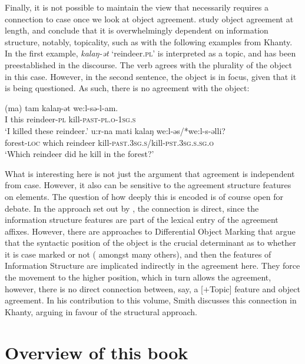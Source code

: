 \documentclass[output=paper
,modfonts
,nonflat]{langsci/langscibook}
\begin{document}
Finally, it is not possible to maintain the view that {\agr} necessarily requires a connection to case once we look at object agreement.
\citet{dn2011} study object agreement at length, and conclude that it is overwhelmingly dependent on information structure, notably, topicality, such as with the following examples from Khanty.
In the first example, \textit{kalaŋ-ət} `reindeer.\textsc{pl}' is interpreted as a topic, and has been preestablished in the discourse. The verb agrees with the plurality of the object in this case.
However, in the second sentence, the object is in focus, given that it is being questioned.
As such, there is no agreement with the object:
\begin{exe}
	\ex
	\begin{xlist}
		\ex
		\gll (ma) tam kalaŋ-ət we:l-sə-l-am.\\
		I this reindeer-\textsc{pl} kill-\textsc{past-pl.o-1sg.s}\\
		\glt ‘I killed these reindeer.’
		\ex
		\gll u:r-na mati kalaŋ we:l-əs/*we:l-s-əlli?\\
		forest-\textsc{loc} which reindeer kill-\textsc{past.3sg.s}/kill-\textsc{pst.3sg.s.sg.o}\\
		\glt `Which reindeer did he kill in the forest?'
	\end{xlist}
\end{exe}
What is interesting here is not just the argument that agreement is independent from case.
However, it also can be sensitive to the agreement structure features on elements.
The question of how deeply this is encoded is of course open for debate.
In the approach set out by \citet{dn2011}, the connection is direct, since the information structure features are part of the lexical entry of the agreement affixes.
However, there are approaches to Differential Object Marking that argue that the syntactic position of the object is the crucial determinant as to whether it is case marked or not (\citealp{woolford1999,woolford2001,Baker2015} amongst many others), and then the features of Information Structure are implicated indirectly in the agreement here.
They force the movement to the higher position, which in turn allows the agreement, however, there is no direct connection between, say, a [$+$Topic] feature and object agreement.
In his contribution to this volume, Smith discusses this connection in Khanty, arguing in favour of the structural approach.

\section{Overview of this book}
\label{secchapteroverviews}
\end{document}
